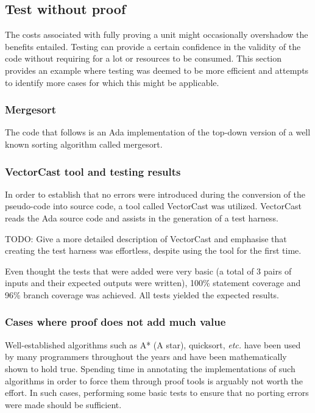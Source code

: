 \documentclass{llncs}
\newcommand{\vectorcast}{VectorCast\xspace}
\newcommand{\etc}{\textit{etc.}\xspace}
\begin{document}
\subsection{Test without proof}
The costs associated with fully proving a unit might occasionally overshadow
the benefits entailed. Testing can provide a certain confidence in the validity of
the code without requiring for a lot or resources to be consumed. This section provides
an example where testing was deemed to be more efficient and attempts to identify more
cases for which this might be applicable.

\subsubsection{Mergesort}
The code that follows is an Ada implementation of the top-down version of a well
known sorting algorithm called mergesort.



\subsubsection{\vectorcast tool and testing results}
In order to establish that no errors were introduced during the conversion of the
pseudo-code into source code, a tool called \vectorcast was utilized. \vectorcast
reads the Ada source code and assists in the generation of a test harness.

TODO:  Give a more detailed description of \vectorcast and emphasise that creating the
test harness was effortless, despite using the tool for the first time.

Even thought the tests that were added were very basic (a total of 3 pairs
of inputs and their expected outputs were written), 100\% statement coverage and 96\%
branch coverage was achieved. All tests yielded the expected results.

\subsubsection{Cases where proof does not add much value}
Well-established algorithms such as A* (A star), quicksort, \etc have
been used by many programmers throughout the years and have been mathematically
shown to hold true. Spending time in annotating the implementations of such algorithms
in order to force them through proof tools is arguably not worth the effort. In such cases,
performing some basic tests to ensure that no porting errors were made should be sufficient.
\end{document}
